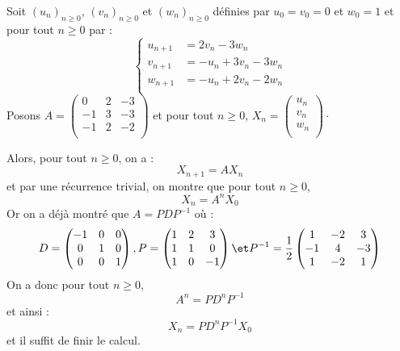 \documentclass[french,11pt,twoside]{VcCours}
\begin{document}
\begin{Exemple}{} Soit $(u_n)_{n \geq 0}$, $(v_n)_{n \geq 0}$ et $(w_n)_{n \geq 0}$ définies par $u_0=v_0=0$ et $w_0=1$ et pour tout $n \geq 0$ par :
$$ \left\lbrace \begin{array}{cll}
u_{n+1} & = 2v_n-3w_n \\
v_{n+1} & = -u_n+3v_n-3w_n \\
w_{n+1} & = -u_n +2v_n-2w_n \\
\end{array}\right.$$
Posons $A = \begin{pmatrix}
0& 2 & -3 \\
-1 & 3 & -3 \\
-1 & 2 & -2 \\
\end{pmatrix}$ et pour tout $n \geq 0$, $X_n = \begin{pmatrix}
u_n \\
v_n \\
w_n \\
\end{pmatrix}\cdot$


Alors, pour tout $n \geq 0$, on a :
$$ X_{n+1}=A X_n$$
et par une récurrence trivial, on montre que pour tout $n \geq 0$,
$$ X_n = A^n X_0$$
Or on a déjà montré que $A=PDP^{-1}$ où :
$$D = \begin{pmatrix}
-1 & 0 & 0 \\
0 & 1 & 0 \\
0 & 0 & 1 \\
\end{pmatrix}, P = \begin{pmatrix}
1 & 2  & 3   \\
1 & 1  & 0 \\
1 & 0  & -1 \\ 
\end{pmatrix} \et P^{-1} = \frac{1}{2} \begin{pmatrix}
1 & -2 & 3 \\
-1 & 4 & -3 \\
1 & -2 &  1 \\
\end{pmatrix}$$
On a donc pour tout $n \geq 0$,
$$ A^n = P D^{n}P^{-1}$$
et ainsi :
$$ X_n = PD^{n}P^{-1} X_0$$
et il suffit de finir le calcul.
\end{Exemple}
\end{document}
